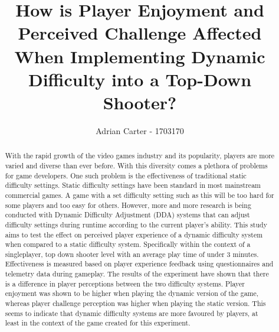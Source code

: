 \documentclass[journal]{IEEEtran}
\begin{document}
%
\title{How is Player Enjoyment and Perceived Challenge Affected When Implementing Dynamic Difficulty into a Top-Down Shooter?}
%
%
\author{Adrian Carter - 1703170}


\maketitle

\begin{abstract}
With the rapid growth of the video games industry and its popularity, players are more varied and diverse than ever before. With this diversity comes a plethora of problems for game developers. One such problem is the effectiveness of traditional static difficulty settings.  Static difficulty settings have been standard in most mainstream commercial games. A game with a set difficulty setting such as this will be too hard for some players and too easy for others. However, more and more research is being conducted with Dynamic Difficulty Adjustment (DDA) systems that can adjust difficulty settings during runtime according to the current  player's ability. This study aims to test the effect on perceived player experience of a dynamic difficulty system when compared to a static difficulty system. Specifically within the context of a singleplayer, top down shooter level with an average play time of under 3 minutes. Effectiveness is measured based on player experience feedback using questionnaires and telemetry data during gameplay. The results of the experiment have shown that there is a difference in player perceptions between the two difficulty systems. Player enjoyment was shown to be higher when playing the dynamic version of the game, whereas player challenge perception was higher when playing the static version. This seems to indicate that dynamic difficulty systems are more favoured by players, at least in the context of the game created for this experiment. 

\end{abstract}
\end{document}
